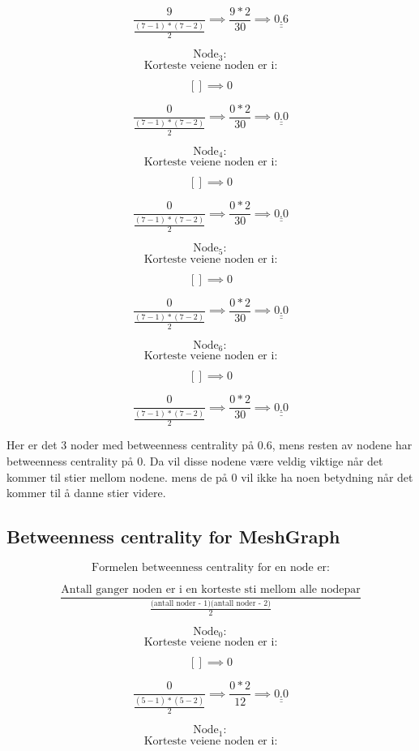 \documentclass[11pt]{article}
\begin{document}
\[ \frac{9}{\frac{(7-1)*(7-2)}{2}} \implies \frac{9*2}{30} \implies \underline{\underline{ 0.6 }}\]

\[\text{Node}_3:\] \[\text{Korteste veiene noden er i:}\]

\[ [] \implies 0 \]

\[ \frac{0}{\frac{(7-1)*(7-2)}{2}} \implies \frac{0*2}{30} \implies \underline{\underline{ 0.0 }}\]

\[\text{Node}_4:\] \[\text{Korteste veiene noden er i:}\]

\[ [] \implies 0 \]

\[ \frac{0}{\frac{(7-1)*(7-2)}{2}} \implies \frac{0*2}{30} \implies \underline{\underline{ 0.0 }}\]

\[\text{Node}_5:\] \[\text{Korteste veiene noden er i:}\]

\[ [] \implies 0 \]

\[ \frac{0}{\frac{(7-1)*(7-2)}{2}} \implies \frac{0*2}{30} \implies \underline{\underline{ 0.0 }}\]

\[\text{Node}_6:\] \[\text{Korteste veiene noden er i:}\]

\[ [] \implies 0 \]

\[ \frac{0}{\frac{(7-1)*(7-2)}{2}} \implies \frac{0*2}{30} \implies \underline{\underline{ 0.0 }}\]

Her er det 3 noder med betweenness centrality på 0.6, mens resten av
nodene har betweenness centrality på 0. Da vil disse nodene være veldig
viktige når det kommer til stier mellom nodene. mens de på 0 vil ikke ha
noen betydning når det kommer til å danne stier videre.

    \hypertarget{betweenness-centrality-for-meshgraph}{%
\subsection*{Betweenness centrality for
MeshGraph}\label{betweenness-centrality-for-meshgraph}}

\[\text{Formelen betweenness centrality for en node er:}\]

\[\frac{\text{Antall ganger noden er i en korteste sti mellom alle nodepar}}{\frac{\text{(antall noder - 1)(antall noder - 2)}}{2}}\]

\[\text{Node}_0:\] \[\text{Korteste veiene noden er i:}\]

\[ [] \implies 0 \]

\[ \frac{0}{\frac{(5-1)*(5-2)}{2}} \implies \frac{0*2}{12} \implies \underline{\underline{ 0.0 }}\]

\[\text{Node}_1:\] \[\text{Korteste veiene noden er i:}\]
\end{document}
